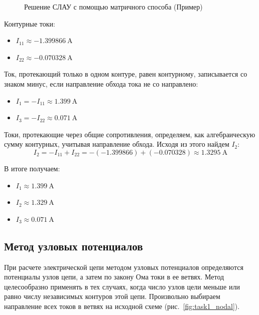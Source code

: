 \documentclass[14pt, a4paper]{styles/gost-7-32} %
\begin{document}
\begin{figure}[H]
  \centering
  \caption{Решение СЛАУ с помощью матричного способа (Пример)}
  \label{fig:task1_mesh_solve}
\end{figure}


Контурные токи:
\begin{itemize}
    \item $I_{11} \approx \SI{-1.399866}{\ampere}$
    \item $I_{22} \approx \SI{-0.070328}{\ampere}$
\end{itemize}

Ток, протекающий только в одном контуре, равен контурному, записывается со знаком минус, если направление обхода тока не со направлено:
\begin{itemize}
    \item $I_1 = -I_{11} \approx \SI{1.399}{\ampere}$
    \item $I_3 = -I_{22} \approx \SI{0.071}{\ampere}$
\end{itemize}

Токи, протекающие через общие сопротивления, определяем, как алгебраическую сумму контурных, учитывая направление обхода. Исходя из этого найдем $I_2$:
\begin{equation}
    I_2 = -I_{11} + I_{22} = -(-1.399866) + (-0.070328) \approx \SI{1.3295}{\ampere}
\end{equation}

В итоге получаем:
\begin{itemize}
    \item $I_1 \approx \SI{1.399}{\ampere}$
    \item $I_2 \approx \SI{1.329}{\ampere}$
    \item $I_3 \approx \SI{0.071}{\ampere}$
\end{itemize}

\subsection{Метод узловых потенциалов}
При расчете электрической цепи методом узловых потенциалов определяются потенциалы узлов цепи, а затем по закону Ома токи в ее ветвях. Метод целесообразно применять в тех случаях, когда число узлов цели меньше или равно числу независимых контуров этой цепи.
Произвольно выбираем направление всех токов в ветвях на исходной схеме (рис.~\ref{fig:task1_nodal}).
\end{document}
